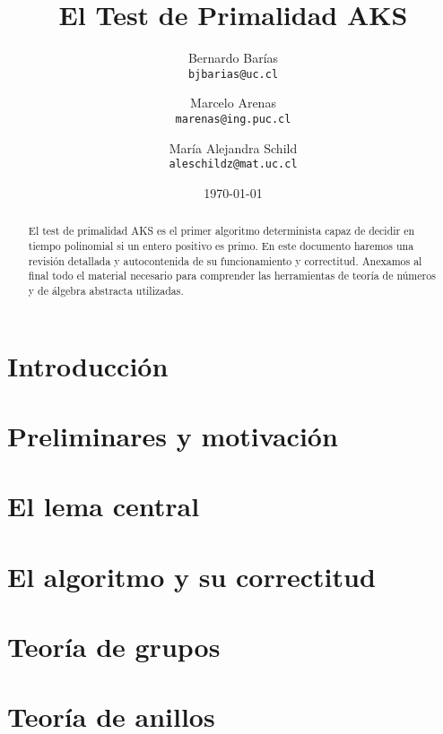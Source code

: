 \documentclass[10pt]{article}
\title{{\bf El Test de Primalidad AKS}}
\author{Bernardo Barías \\ 
\texttt{bjbarias@uc.cl}
\and 
Marcelo Arenas\\
\texttt{marenas@ing.puc.cl}
\and
María Alejandra Schild\\
\texttt{aleschildz@mat.uc.cl}}
\date{\today}
\newcommand{\0}{\mathbf{0}}
\newcommand{\1}{\mathbf{1}}
\newcommand{\+}{\oplus}
\theoremstyle{definition}
\theoremstyle{remark}
\theoremstyle{remark}
\begin{document}
	
	\maketitle
	
	
	\begin{abstract}
\noindent El test de primalidad AKS \cite{AKS04} es el primer algoritmo
determinista capaz de decidir en tiempo polinomial si un entero positivo es primo.
En este documento haremos una revisión detallada y autocontenida de su funcionamiento y correctitud. Anexamos al final todo el material necesario para comprender las herramientas de teoría de números y de álgebra abstracta utilizadas.
\end{abstract}


\section{Introducción}


\section{Preliminares y motivación}
\label{sec-notacion}


    
\section{El lema central}
\label{sec-lema-central}

	
\section{El algoritmo y su correctitud}
\label{sec-algoritmo-correctitud}





\appendix

\newpage


\section{Teoría de grupos}
\label{app-grupos}


\newpage

\section{Teoría de anillos}
\label{app-anillos}

\end{document}
